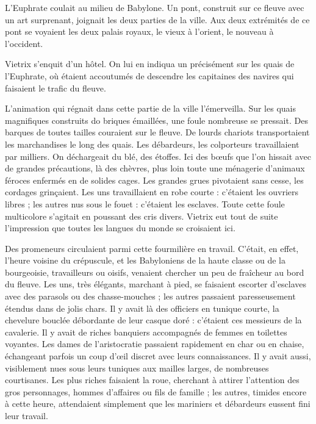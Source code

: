 \documentclass[a4paper, 11pt, oneside, polutonikogreek, french]{article}
\begin{document}
L'Euphrate coulait au milieu de Babylone. Un pont, construit sur ce fleuve avec un art surprenant, joignait les deux parties de la ville. Aux deux extrémités de ce pont se voyaient les deux palais royaux, le vieux à l'orient, le nouveau à l'occident.

\bigskip
\centerline{\EightStarTaper}
\centerline{\EightStarTaper\EightStarTaper}
\bigskip

Vietrix s'enquit d'un hôtel. On lui en indiqua un précisément sur les quais de l'Euphrate, où étaient accoutumés de descendre les capitaines des navires qui faisaient le trafic du fleuve.

L'animation qui régnait dans cette partie de la ville l'émerveilla. Sur les quais magnifiques construits do briques émaillées, une foule nombreuse se pressait. Des barques de toutes tailles couraient sur le fleuve. De lourds chariots transportaient les marchandises le long des quais. Les débardeurs, les colporteurs travaillaient par milliers. On déchargeait du blé, des étoffes. Ici des bœufs que l'on hissait avec de grandes précautions, là des chèvres, plus loin toute une ménagerie d'animaux féroces enfermés en de solides cages. Les grandes grues pivotaient sans cesse, les cordages grinçaient. Les uns travaillaient en robe courte : c'étaient les ouvriers libres ; les autres nus sous le fouet : c'étaient les esclaves. Toute cette foule multicolore s'agitait en poussant des cris divers. Vietrix eut tout de suite l'impression que toutes les langues du monde se croisaient ici.

Des promeneurs circulaient parmi cette fourmilière en travail. C'était, en effet, l'heure voisine du crépuscule, et les Babyloniens de la haute classe ou de la bourgeoisie, travailleurs ou oisifs, venaient chercher un peu de fraîcheur au bord du fleuve. Les uns, très élégants, marchant à pied, se faisaient escorter d'esclaves avec des parasols ou des chasse-mouches ; les autres passaient paresseusement étendus dans de jolis chars. Il y avait là des officiers en tunique courte, la chevelure bouclée débordante de leur casque doré : c'étaient ces messieurs de la cavalerie. Il y avait de riches banquiers accompagnés de femmes en toilettes voyantes. Les dames de l'aristocratie passaient rapidement en char ou en chaise, échangeant parfois un coup d'œil discret avec leurs connaissances. Il y avait aussi, visiblement nues sous leurs tuniques aux mailles larges, de nombreuses courtisanes. Les plus riches faisaient la roue, cherchant à attirer l'attention des gros personnages, hommes d'affaires ou fils de famille ; les autres, timides encore à cette heure, attendaient simplement que les mariniers et débardeurs eussent fini leur travail.
\end{document}
